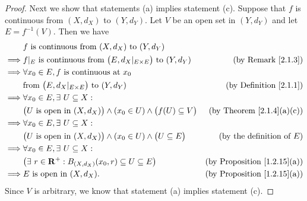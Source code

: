 \begin{proof}
    Next we show that statements (a) implies statement (c).
    Suppose that \(f\) is continuous from \((X, d_X)\) to \((Y, d_Y)\).
    Let \(V\) be an open set in \((Y, d_Y)\) and let \(E = f^{-1}(V)\).
    Then we have
    \begin{align*}
                 & f \text{ is continuous from } (X, d_X) \text{ to } (Y, d_Y)                                                                           \\
        \implies & f|_{E} \text{ is continuous from } \big(E, d_X|_{E \times E}\big) \text{ to } (Y, d_Y)      & \text{(by Remark \ref{2.1.3})}          \\
        \implies & \forall x_0 \in E, f \text{ is continuous at } x_0                                                                                    \\
                 & \text{from } \big(E, d_X|_{E \times E}\big) \text{ to } (Y, d_Y)                            & \text{(by Definition \ref{2.1.1})}      \\
        \implies & \forall x_0 \in E, \exists\ U \subseteq X :                                                                                           \\
                 & \big(U \text{ is open in } (X, d_X)\big) \land (x_0 \in U) \land \big(f(U) \subseteq V\big) & \text{(by Theorem \ref{2.1.4}(a)(c))}   \\
        \implies & \forall x_0 \in E, \exists\ U \subseteq X :                                                                                           \\
                 & \big(U \text{ is open in } (X, d_X)\big) \land (x_0 \in U) \land \big(U \subseteq E\big)    & \text{(by the definition of \(E\))}     \\
        \implies & \forall x_0 \in E, \exists\ U \subseteq X :                                                                                           \\
                 & \big(\exists\ r \in \mathbf{R}^+ : B_{(X, d_X)}(x_0, r) \subseteq U \subseteq E\big)        & \text{(by Proposition \ref{1.2.15}(a))} \\
        \implies & E \text{ is open in } (X, d_X).                                                             & \text{(by Proposition \ref{1.2.15}(a))}
    \end{align*}
    Since \(V\) is arbitrary, we know that statement (a) implies statement (c).


\end{proof}
